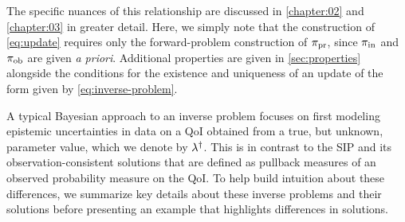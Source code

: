 The specific nuances of this relationship are discussed in \ref{chapter:02} and \ref{chapter:03} in greater detail.
Here, we simply note that the construction of \eqref{eq:update} requires only the forward-problem construction of $\operatorname*{\pi_{pr}}$, since $\operatorname*{\pi_{in}}$ and $\operatorname*{\pi_{ob}}$ are given \emph{a priori}.
Additional properties are given in \ref{sec:properties} alongside the conditions for the existence and uniqueness of an update of the form given by \eqref{eq:inverse-problem}.






A typical Bayesian approach to an inverse problem focuses on first modeling epistemic uncertainties in data on a QoI obtained from a true, but unknown, parameter value, which we denote by $\lambda^\dagger$.
This is in contrast to the SIP and its observation-consistent solutions that are defined as pullback measures of an observed probability measure on the QoI.
To help build intuition about these differences, we summarize key details about these inverse problems and their solutions before presenting an example that highlights differences in solutions.





